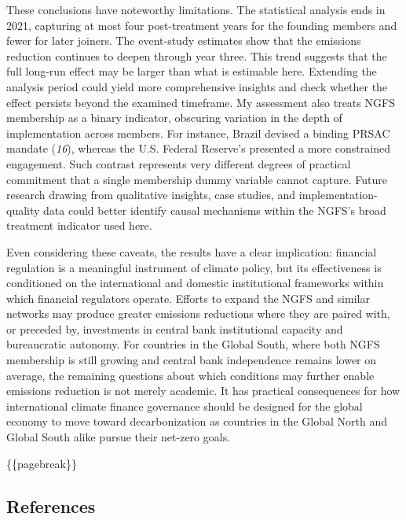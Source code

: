 \documentclass[
  12pt,
  letterpaper,
]{article}
\begin{document}
These conclusions have noteworthy limitations. The statistical analysis
ends in 2021, capturing at most four post-treatment years for the
founding members and fewer for later joiners. The event-study estimates
show that the emissions reduction continues to deepen through year
three. This trend suggests that the full long-run effect may be larger
than what is estimable here. Extending the analysis period could yield
more comprehensive insights and check whether the effect persists beyond
the examined timeframe. My assessment also treats NGFS membership as a
binary indicator, obscuring variation in the depth of implementation
across members. For instance, Brazil devised a binding PRSAC mandate
(\emph{16}), whereas the U.S. Federal Reserve's presented a more
constrained engagement. Such contrast represents very different degrees
of practical commitment that a single membership dummy variable cannot
capture. Future research drawing from qualitative insights, case
studies, and implementation-quality data could better identify causal
mechanisms within the NGFS's broad treatment indicator used here.

Even considering these caveats, the results have a clear implication:
financial regulation is a meaningful instrument of climate policy, but
its effectiveness is conditioned on the international and domestic
institutional frameworks within which financial regulators operate.
Efforts to expand the NGFS and similar networks may produce greater
emissions reductions where they are paired with, or preceded by,
investments in central bank institutional capacity and bureaucratic
autonomy. For countries in the Global South, where both NGFS membership
is still growing and central bank independence remains lower on average,
the remaining questions about which conditions may further enable
emissions reduction is not merely academic. It has practical
consequences for how international climate finance governance should be
designed for the global economy to move toward decarbonization as
countries in the Global North and Global South alike pursue their
net-zero goals.

\{\{pagebreak\}\}

\subsection{References}\label{references}

\singlespacing
\end{document}
